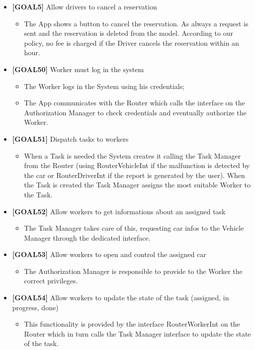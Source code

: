 \begin{itemize}
\begin{itemize}
	\end{itemize}
\item \textbf{[GOAL5]} Allow drivers to cancel a reservation
	\begin{itemize}
	\item The App shows a button to cancel the reservation. As always a request is sent and the reservation is deleted from the model. According to our policy, no fee is charged if the Driver cancels the reservation within an hour.
	\end{itemize}
\item \textbf{[GOAL50]} Worker must log in the system
	\begin{itemize}
	\item The Worker logs in the System using his credentials;
	\item The App communicates with the Router which calls the interface on the Authorization Manager to check credentials and eventually authorize the Worker.
	\end{itemize}
\item \textbf{[GOAL51]} Dispatch tasks to workers
	\begin{itemize}
	\item When a Task is needed the System creates it calling the Task Manager from the Router (using RouterVehicleInt if the malfunction is detected by the car or RouterDriverInt if the report is generated by the user). When the Task is created the Task Manager assigns the most suitable Worker to the Task.
	\end{itemize}
\item \textbf{[GOAL52]} Allow workers to get informations about an assigned task
	\begin{itemize}
	\item The Task Manager takes care of this, requesting car infos to the Vehicle Manager through the dedicated interface.
	\end{itemize}
\item \textbf{[GOAL53]} Allow workers to open and control the assigned car
	\begin{itemize}
	\item The Authorization Manager is responsible to provide to the Worker the correct privileges. 
	\end{itemize}
\item \textbf{[GOAL54]} Allow workers to update the state of the task (assigned, in progress, done)
	\begin{itemize}
	\item This functionality is provided by the interface RouterWorkerInt on the Router which in turn calls the Task Manager interface to update the state of the task.

\end{itemize}
\end{itemize}
